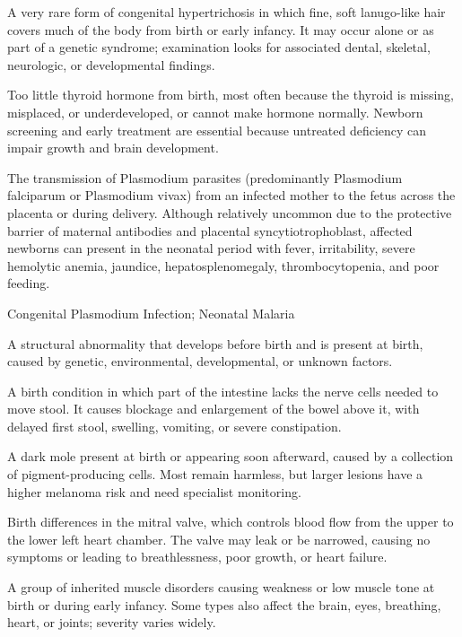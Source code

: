  A very rare form of congenital hypertrichosis in which fine, soft lanugo-like hair covers much of the body from birth or early infancy. It may occur alone or as part of a genetic syndrome; examination looks for associated dental, skeletal, neurologic, or developmental findings.

 Too little thyroid hormone from birth, most often because the thyroid is missing, misplaced, or underdeveloped, or cannot make hormone normally. Newborn screening and early treatment are essential because untreated deficiency can impair growth and brain development.

 The transmission of Plasmodium parasites (predominantly Plasmodium falciparum or Plasmodium vivax) from an infected mother to the fetus across the placenta or during delivery. Although relatively uncommon due to the protective barrier of maternal antibodies and placental syncytiotrophoblast, affected newborns can present in the neonatal period with fever, irritability, severe hemolytic anemia, jaundice, hepatosplenomegaly, thrombocytopenia, and poor feeding.

\synonyms
Congenital Plasmodium Infection; Neonatal Malaria

 A structural abnormality that develops before birth and is present at birth, caused by genetic, environmental, developmental, or unknown factors.

 A birth condition in which part of the intestine lacks the nerve cells needed to move stool. It causes blockage and enlargement of the bowel above it, with delayed first stool, swelling, vomiting, or severe constipation.

 A dark mole present at birth or appearing soon afterward, caused by a collection of pigment-producing cells. Most remain harmless, but larger lesions have a higher melanoma risk and need specialist monitoring.

 Birth differences in the mitral valve, which controls blood flow from the upper to the lower left heart chamber. The valve may leak or be narrowed, causing no symptoms or leading to breathlessness, poor growth, or heart failure.

 A group of inherited muscle disorders causing weakness or low muscle tone at birth or during early infancy. Some types also affect the brain, eyes, breathing, heart, or joints; severity varies widely.


